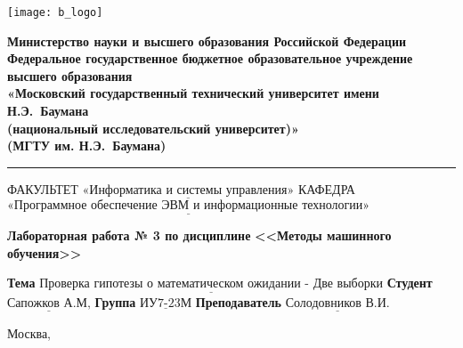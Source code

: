 \thispagestyle{empty}

\noindent \begin{minipage}{0.15\textwidth}
	\texttt{[image: b\_logo]}
\end{minipage}
\noindent\begin{minipage}{0.85\textwidth}\centering
	\textbf{Министерство науки и высшего образования Российской Федерации}\\
	\textbf{Федеральное государственное бюджетное образовательное учреждение высшего образования}\\
	\textbf{«Московский государственный технический университет имени Н.Э.~Баумана}\\
	\textbf{(национальный исследовательский университет)»}\\
	\textbf{(МГТУ им. Н.Э.~Баумана)}
\end{minipage}

\noindent\rule{\linewidth}{3pt}
\newline\newline
\noindent ФАКУЛЬТЕТ $\underline{\text{«Информатика и системы управления»}}$ \newline\newline
\noindent КАФЕДРА $\underline{\text{«Программное обеспечение ЭВМ и информационные технологии»}}$

\vspace{1cm}

\begin{center}
	\noindent\begin{minipage}{1.3\textwidth}\centering
		\Large\textbf{  Лабораторная работа № 3 по дисциплине}\newline
		\textbf{<<Методы машинного обучения>>}\newline
	\end{minipage}
\end{center}

\noindent\textbf{Тема} $\underline{\text{Проверка гипотезы о математическом ожидании - Две выборки}}$\newline\newline
\noindent\textbf{Студент} $\underline{\text{Сапожков А.М,}}$\newline\newline
\noindent\textbf{Группа} $\underline{\text{ИУ7-23М}}$\newline\newline
\noindent\textbf{Преподаватель} $\underline{\text{Солодовников В.И.}}$\newline

\begin{center}
	\vfill
	Москва,~\the\year
\end{center}
\clearpage
